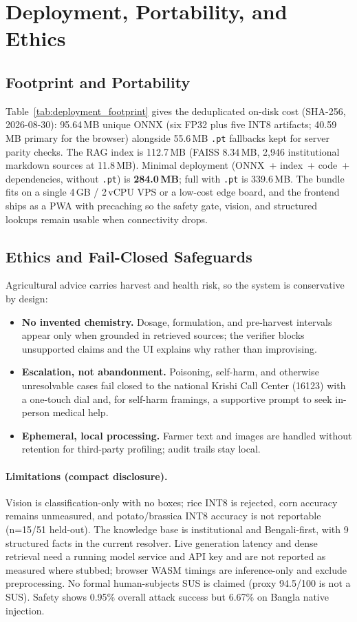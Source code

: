 ﻿\section{Deployment, Portability, and Ethics}
\label{sec:deployment_ethics}

\subsection{Footprint and Portability}
Table~\ref{tab:deployment_footprint} gives the deduplicated on-disk cost (SHA-256, 2026-08-30): 95.64\,MB unique ONNX (six FP32 plus five INT8 artifacts; 40.59\,MB primary for the browser) alongside 55.6\,MB {\tt .pt} fallbacks kept for server parity checks. The RAG index is 112.7\,MB (FAISS 8.34\,MB, 2,946 institutional markdown sources at 11.8\,MB). Minimal deployment (ONNX~+ index~+ code~+ dependencies, without {\tt .pt}) is \textbf{284.0\,MB}; full with {\tt .pt} is 339.6\,MB. The bundle fits on a single 4\,GB / 2\,vCPU VPS or a low-cost edge board, and the frontend ships as a PWA with precaching so the safety gate, vision, and structured lookups remain usable when connectivity drops.

\subsection{Ethics and Fail-Closed Safeguards}
Agricultural advice carries harvest and health risk, so the system is conservative by design:

\begin{itemize}
    \item \textbf{No invented chemistry.} Dosage, formulation, and pre-harvest intervals appear only when grounded in retrieved sources; the verifier blocks unsupported claims and the UI explains why rather than improvising.
    \item \textbf{Escalation, not abandonment.} Poisoning, self-harm, and otherwise unresolvable cases fail closed to the national Krishi Call Center (16123) with a one-touch dial and, for self-harm framings, a supportive prompt to seek in-person medical help.
    \item \textbf{Ephemeral, local processing.} Farmer text and images are handled without retention for third-party profiling; audit trails stay local.
\end{itemize}

\paragraph{Limitations (compact disclosure).} Vision is classification-only with no boxes; rice INT8 is rejected, corn accuracy remains unmeasured, and potato/brassica INT8 accuracy is not reportable (n=15/51 held-out). The knowledge base is institutional and Bengali-first, with 9 structured facts in the current resolver. Live generation latency and dense retrieval need a running model service and API key and are not reported as measured where stubbed; browser WASM timings are inference-only and exclude preprocessing. No formal human-subjects SUS is claimed (proxy 94.5/100 is not a SUS). Safety shows 0.95\% overall attack success but 6.67\% on Bangla native injection.